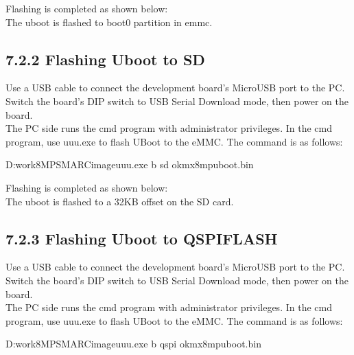 \documentclass[letterpaper,10pt,openany,english]{sphinxmanual}
\begin{document}
\sphinxAtStartPar
Flashing is completed as shown below:\\
The uboot is flashed to boot0 partition in emmc.


\subsection{7.2.2 Flashing Uboot to SD}
\label{\detokenize{linux-manual:flashing-uboot-to-sd}}
\sphinxAtStartPar
Use a USB cable to connect the development board’s Micro\sphinxhyphen{}USB port to the PC. Switch the board’s DIP switch to USB Serial Download mode, then power on the board.\\
The PC side runs the cmd program with administrator privileges. In the cmd program, use uuu.exe to flash U\sphinxhyphen{}Boot to the eMMC. The command is as follows:

\begin{sphinxVerbatim}[commandchars=\\\{\}]
D:\PYGZbs{}work\PYGZbs{}8MP\PYGZus{}SMARC\PYGZbs{}image\PYGZgt{}uuu.exe \PYGZhy{}b sd ok\PYGZhy{}mx8mp\PYGZhy{}uboot.bin
\end{sphinxVerbatim}

\sphinxAtStartPar
Flashing is completed as shown below:\\
The uboot is flashed to a 32KB offset on the SD card.


\subsection{7.2.3 Flashing Uboot to QSPIFLASH}
\label{\detokenize{linux-manual:flashing-uboot-to-qspiflash}}
\sphinxAtStartPar
Use a USB cable to connect the development board’s Micro\sphinxhyphen{}USB port to the PC. Switch the board’s DIP switch to USB Serial Download mode, then power on the board.\\
The PC side runs the cmd program with administrator privileges. In the cmd program, use uuu.exe to flash U\sphinxhyphen{}Boot to the eMMC. The command is as follows:

\begin{sphinxVerbatim}[commandchars=\\\{\}]
D:\PYGZbs{}work\PYGZbs{}8MP\PYGZus{}SMARC\PYGZbs{}image\PYGZgt{}uuu.exe \PYGZhy{}b qspi ok\PYGZhy{}mx8mp\PYGZhy{}uboot.bin
\end{sphinxVerbatim}
\end{document}
